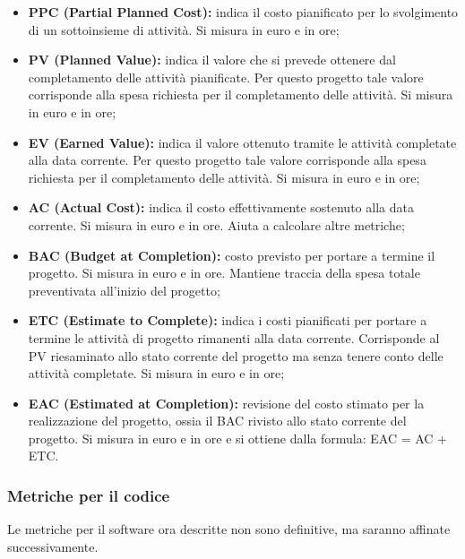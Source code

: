 		\begin{itemize}
			\item \textbf{PPC (Partial Planned Cost): }indica il costo pianificato per lo svolgimento di un sottoinsieme di attività. Si misura in euro e in ore;
			\item \textbf{PV (Planned Value): }indica il valore che si prevede ottenere dal completamento delle attività pianificate. Per questo progetto tale valore corrisponde alla spesa richiesta per il completamento delle attività. Si misura in euro e in ore;
			\item \textbf{EV (Earned Value): }indica il valore ottenuto tramite le attività completate alla data corrente. Per questo progetto tale valore corrisponde alla spesa richiesta per il completamento delle attività. Si misura in euro e in ore;
			\item \textbf{AC (Actual Cost): }indica il costo effettivamente sostenuto alla data corrente. Si misura in euro e in ore. Aiuta a calcolare altre metriche;
			\item \textbf{BAC (Budget at Completion): }costo previsto per portare a termine il progetto. Si misura in euro e in ore. Mantiene traccia della spesa totale preventivata all'inizio del progetto;
			\item \textbf{ETC (Estimate to Complete): }indica i costi pianificati per portare a termine le attività di progetto rimanenti alla data corrente. Corrisponde al PV riesaminato allo stato corrente del progetto ma senza tenere conto delle attività completate. Si misura in euro e in ore;
			\item \textbf{EAC (Estimated at Completion): }revisione del costo stimato per la realizzazione del progetto, ossia il BAC rivisto allo stato corrente del progetto. Si misura in euro e in ore e si ottiene dalla formula: EAC = AC + ETC.			
		\end{itemize}
	
	
		\subsubsection{Metriche per il codice}
		Le metriche per il software ora descritte non sono definitive, ma saranno affinate successivamente.
		
